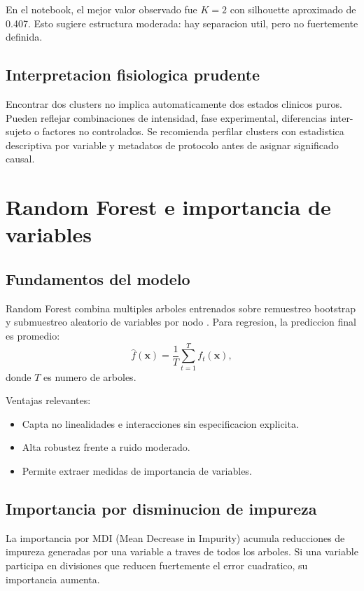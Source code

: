 \documentclass[12pt,a4paper,oneside]{report}
\begin{document}
En el notebook, el mejor valor observado fue $K=2$ con silhouette aproximado de 0.407. Esto sugiere estructura moderada: hay separacion util, pero no fuertemente definida.

\section{Interpretacion fisiologica prudente}

Encontrar dos clusters no implica automaticamente dos estados clinicos puros. Pueden reflejar combinaciones de intensidad, fase experimental, diferencias inter-sujeto o factores no controlados. Se recomienda perfilar clusters con estadistica descriptiva por variable y metadatos de protocolo antes de asignar significado causal.

\chapter{Random Forest e importancia de variables}

\section{Fundamentos del modelo}

Random Forest combina multiples arboles entrenados sobre remuestreo bootstrap y submuestreo aleatorio de variables por nodo \cite{breiman2001}. Para regresion, la prediccion final es promedio:
\[
\hat{f}(\mathbf{x}) = \frac{1}{T}\sum_{t=1}^{T} f_t(\mathbf{x}),
\]
donde $T$ es numero de arboles.

Ventajas relevantes:
\begin{itemize}
\item Capta no linealidades e interacciones sin especificacion explicita.
\item Alta robustez frente a ruido moderado.
\item Permite extraer medidas de importancia de variables.
\end{itemize}

\section{Importancia por disminucion de impureza}

La importancia por MDI (Mean Decrease in Impurity) acumula reducciones de impureza generadas por una variable a traves de todos los arboles. Si una variable participa en divisiones que reducen fuertemente el error cuadratico, su importancia aumenta.
\end{document}

